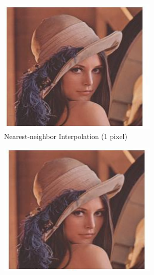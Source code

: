 \begin{figure}[H]
\hspace*{\fill} %
\begin{subfigure}{0.31\textwidth}
\includegraphics[width=\linewidth]{img/preprocessing/interp_nn.pdf}
\caption{Nearest-neighbor Interpolation (1 pixel)} \label{fig:1a}
\end{subfigure}
\hspace*{\fill} %
\begin{subfigure}{0.31\textwidth}
\includegraphics[width=\linewidth]{img/preprocessing/interp_bili.pdf}

\end{subfigure}
\end{figure}
